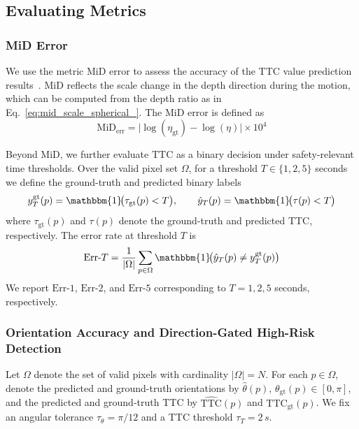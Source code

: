 \documentclass[journal]{IEEEtran}
\begin{document}
\subsection{Evaluating Metrics}

\subsubsection{MiD Error}
We use the metric MiD error to assess the accuracy of the TTC value prediction results~\cite{li2024fpttc}. MiD reflects the scale change in the depth direction during the motion, which can be computed from the depth ratio as in Eq.~\ref{eq:mid_scale_spherical_}. The MiD error is defined as
\begin{equation}
\label{eq:mid_err}
\mathrm{MiD}_{\mathrm{err}}=\bigl|\log(\eta_{\mathrm{gt}})-\log(\eta)\bigr|\times 10^{4}
\end{equation}

Beyond MiD, we further evaluate \(\mathrm{TTC}\) as a binary decision under safety-relevant time thresholds. Over the valid pixel set \(\Omega\), for a threshold \(T\in\{1,2,5\}\) seconds we define the ground-truth and predicted binary labels
\begin{equation}
\label{eq:ttc_bin}
y^{\mathrm{gt}}_{T}(p)=\mathbbm{1}\!\big(\tau_{\mathrm{gt}}(p)<T\big),\qquad
\hat{y}_{T}(p)=\mathbbm{1}\!\big(\tau(p)<T\big)
\end{equation}
where \(\tau_{\mathrm{gt}}(p)\) and \(\tau(p)\) denote the ground-truth and predicted TTC, respectively. The error rate at threshold \(T\) is
\begin{equation}
\label{eq:err_T}
\mathrm{Err}\text{-}T=\frac{1}{|\Omega|}\sum_{p\in\Omega}\mathbbm{1}\!\big(\hat{y}_{T}(p)\neq y^{\mathrm{gt}}_{T}(p)\big)
\end{equation}
We report \(\mathrm{Err}\text{-}1\), \(\mathrm{Err}\text{-}2\), and \(\mathrm{Err}\text{-}5\) corresponding to \(T=1,2,5\) seconds, respectively.

\subsubsection{Orientation Accuracy and Direction-Gated High-Risk Detection}
Let \(\Omega\) denote the set of valid pixels with cardinality \(|\Omega|=N\). For each \(p\in\Omega\), denote the predicted and ground-truth orientations by \(\hat{\theta}(p),\,\theta_{\mathrm{gt}}(p)\in[0,\pi]\), and the predicted and ground-truth TTC by \(\widehat{\mathrm{TTC}}(p)\) and \(\mathrm{TTC}_{\mathrm{gt}}(p)\). We fix an angular tolerance \(\tau_\theta=\pi/12\)  and a TTC threshold \(\tau_T=2\,s\).
\end{document}
